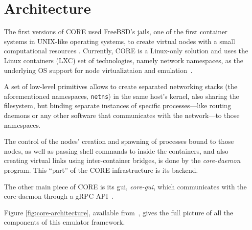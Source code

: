 \section{Architecture}
\label{sec:corearchitecture}

The first versions of CORE used FreeBSD's jails, one of the first container systems in UNIX-like operating systems, to create virtual nodes with a small computational resources \cite{comparisonofcore,freebsdjails}.
Currently, CORE is a Linux-only solution and uses the Linux containers (LXC) set of technologies, namely network namespaces, as the underlying OS support for node virtualiztaion and emulation~\cite{coreghdocs}.

A set of low-level primitives allows to create separated networking stacks (the aforementioned namespaces, \texttt{netns}) in the same host's kernel, also sharing the filesystem, but binding separate instances of specific processes---like routing daemons or any other software that communicates with the network---to those namespaces.

The control of the nodes' creation and spawning of processes bound to those nodes, as well as passing shell commands to inside the containers, and also creating virtual links using inter-container bridges, is done by the \emph{core-daemon} program.
This ``part'' of the CORE infrastructure is its backend.

The other main piece of CORE is its \gls{gui}, \emph{core-gui}, which communicates with the core-daemon through a gRPC API~\cite{grpc}.



Figure \ref{fig:core-architecture}, available from~\cite{coreghdocs}, gives the full picture of all the components of this emulator framework.

